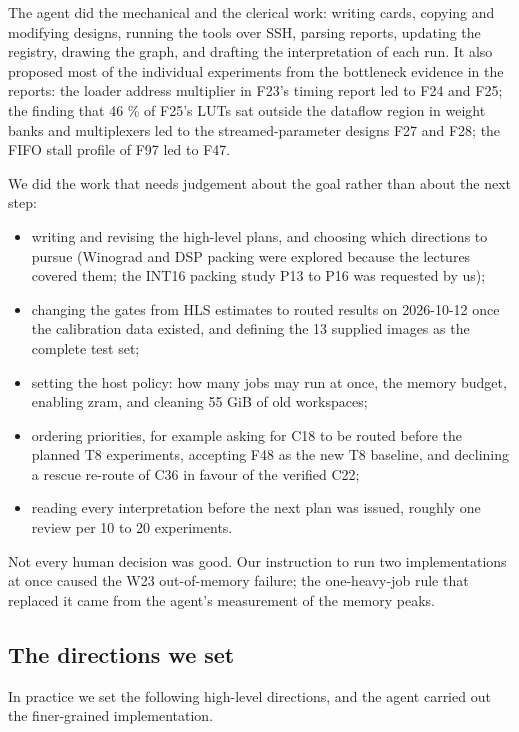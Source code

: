 The agent did the mechanical and the clerical work: writing cards, copying and modifying designs, running the tools over SSH, parsing reports, updating the registry, drawing the graph, and drafting the interpretation of each run. It also proposed most of the individual experiments from the bottleneck evidence in the reports: the loader address multiplier in F23's timing report led to F24 and F25; the finding that 46 \% of F25's LUTs sat outside the dataflow region in weight banks and multiplexers led to the streamed-parameter designs F27 and F28; the FIFO stall profile of F97 led to F47.

We did the work that needs judgement about the goal rather than about the next step:

\begin{itemize}
\item writing and revising the high-level plans, and choosing which directions to pursue (Winograd and DSP packing were explored because the lectures covered them; the INT16 packing study P13 to P16 was requested by us);
\item changing the gates from HLS estimates to routed results on 2026-10-12 once the calibration data existed, and defining the 13 supplied images as the complete test set;
\item setting the host policy: how many jobs may run at once, the memory budget, enabling zram, and cleaning 55 GiB of old workspaces;
\item ordering priorities, for example asking for C18 to be routed before the planned T8 experiments, accepting F48 as the new T8 baseline, and declining a rescue re-route of C36 in favour of the verified C22;
\item reading every interpretation before the next plan was issued, roughly one review per 10 to 20 experiments.
\end{itemize}

Not every human decision was good. Our instruction to run two implementations at once caused the W23 out-of-memory failure; the one-heavy-job rule that replaced it came from the agent's measurement of the memory peaks.

\subsection{The directions we set}\label{sec:3.6}

In practice we set the following high-level directions, and the agent carried out the finer-grained implementation.

